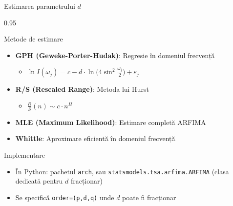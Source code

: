 \documentclass[9pt, aspectratio=169, t]{beamer}
\begin{document}
\begin{frame}{Estimarea parametrului $d$}
    \begin{cminipage}{0.95\textwidth}
        \begin{block}{Metode de estimare}
            \begin{itemize}\setlength{\itemsep}{0pt}
                \item \textbf{GPH (Geweke-Porter-Hudak)}: Regresie în domeniul frecvență
                \begin{itemize}\setlength{\itemsep}{0pt}
                    \item $\ln I(\omega_j) = c - d \cdot \ln\bigl(4\sin^2\frac{\omega_j}{2}\bigr) + \varepsilon_j$
                \end{itemize}
                \item \textbf{R/S (Rescaled Range)}: Metoda lui Hurst
                \begin{itemize}\setlength{\itemsep}{0pt}
                    \item $\frac{R}{S}(n) \sim c \cdot n^H$
                \end{itemize}
                \item \textbf{MLE (Maximum Likelihood)}: Estimare completă ARFIMA
                \item \textbf{Whittle}: Aproximare eficientă în domeniul frecvență
            \end{itemize}
        \end{block}

        \vspace{0.2cm}

        {\footnotesize
        \begin{exampleblock}{Implementare}
            \begin{itemize}\setlength{\itemsep}{0pt}
                \item În Python: pachetul \texttt{arch}, sau \texttt{statsmodels.tsa.arfima.ARFIMA} (clasa dedicată pentru $d$ fracționar)
                \item Se specifică \texttt{order=(p,d,q)} unde $d$ poate fi fracționar
            \end{itemize}
        \end{exampleblock}
        }
    \end{cminipage}
\end{frame}
\end{document}
